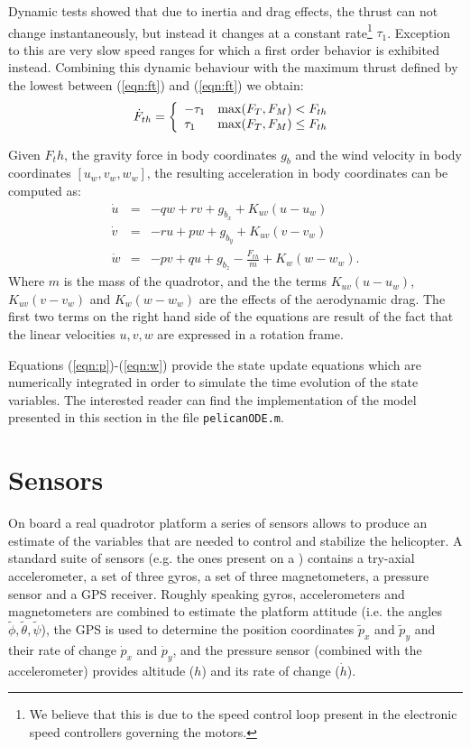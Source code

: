 \documentclass[a4paper,11pt]{report}
\begin{document}
Dynamic tests showed that due to inertia and drag effects, the thrust can not change instantaneously, but instead it changes at a constant rate\footnote{We believe that this is due to the speed control loop present in the electronic speed controllers governing the motors.} $\tau_1$. Exception to this are very slow speed ranges for which a first order behavior is exhibited instead. Combining this dynamic behaviour with the maximum thrust defined by the lowest between (\ref{eqn:ft}) and (\ref{eqn:ft}) we obtain:
\begin{equation}
\dot{F}_{th}=\left\{ \begin{array}{l l} -\tau_1 & \max(F_T,F_M)<F_{th} \\ \tau_1  & \max(F_T,F_M)\leq F_{th} \end{array} \right .\\
\end{equation}

Given $F_th$, the gravity force in body coordinates $g_b$ and the wind velocity in body coordinates $[u_w,v_w,w_w]$, the resulting acceleration in body coordinates can be computed as:
\begin{eqnarray}
\dot{u} &=& -q w + r v + g_{b_x} + K_{uv}(u-u_w)\\
\dot{v} &=& -r u + p w + g_{b_y} + K_{uv}(v-v_w)\\
\dot{w} & =& -p v + q u + g_{b_z} - \frac{F_{th}}{m} + K_w (w-w_w). \label{eqn:w}
\end{eqnarray}
Where $m$ is the mass of the quadrotor, and the the terms $K_{uv}(u-u_w)$,$K_{uv}(v-v_w)$ and $K_w(w-w_w)$ are the effects of the aerodynamic drag. The first two terms on the right hand side of the equations are result of the fact that the linear velocities $u,v,w$ are expressed in a rotation frame. 
 
Equations (\ref{eqn:p})-(\ref{eqn:w}) provide the state update equations which are numerically integrated in order to simulate the time evolution of the state variables.
The interested reader can find the implementation of the model presented in this section in the file \texttt{pelicanODE.m}.  


\section{Sensors}

On board a real quadrotor platform a series of sensors allows to produce an estimate of the variables that are needed to control and stabilize the helicopter.
A standard suite of sensors (e.g. the ones present on a \cite{asctec2011pelican}) contains a try-axial accelerometer, a set of three gyros, a set of three magnetometers, a pressure sensor and a GPS receiver.
Roughly speaking gyros, accelerometers and magnetometers are combined to estimate the platform attitude (i.e. the angles $\tilde{\phi},\tilde{\theta},\tilde{\psi}$), the GPS is used to determine the position coordinates $\tilde{p}_x$ and $\tilde{p}_y$ and their rate of change $\dot{p}_x$ and $\dot{p}_y$, and the pressure sensor (combined with the accelerometer) provides altitude ($h$) 
and its rate of change ($\dot{h}$).
\end{document}
